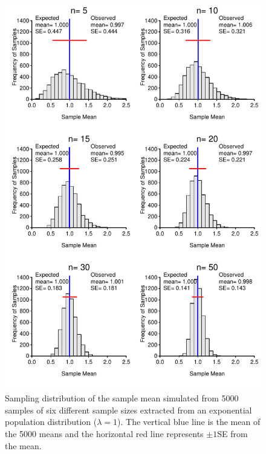 \documentclass[10pt,openany]{book}\usepackage[]{graphicx}\usepackage[]{color}
\newenvironment{knitrout}{}{} %
\begin{document}
\begin{knitrout}
\color{fgcolor}\begin{figure}[hbtp]

{\centering \includegraphics[width=.8\linewidth]{Figs/SampDistExpMeann-1} 

}

\caption[Sampling distribution of sample means from exponential distribution]{Sampling distribution of the sample mean simulated from 5000 samples of six different sample sizes extracted from an exponential population distribution ($\lambda=1$).  The vertical blue line is the mean of the 5000 means and the horizontal red line represents $\pm1$SE from the mean.}\label{fig:SampDistExpMeann}
\end{figure}


\end{knitrout}
\end{document}
